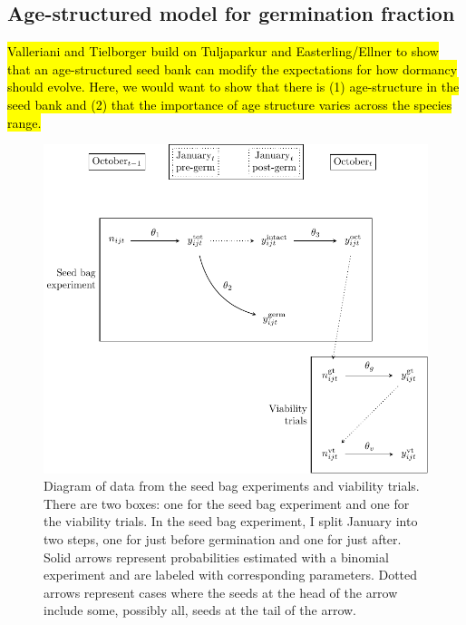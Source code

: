 \documentclass[12pt, oneside, titlepage]{article}   	%
\begin{document}
\subsection{Age-structured model for germination fraction}

\hl{Valleriani and Tielborger build on Tuljaparkur and Easterling/Ellner to show that an age-structured seed bank can modify the expectations for how dormancy should evolve. Here, we would want to show that there is (1) age-structure in the seed bank and (2) that the importance of age structure varies across the species range.}
\fi

\clearpage

\begin{figure}[!htbp]
\centering
       \includegraphics[page=1,width=.9\textwidth]{../../miscellaneous/seed-bag-figure.pdf}  
  \caption{Diagram of data from the seed bag experiments and viability trials. There are two boxes: one for the seed bag experiment and one for the viability trials. In the seed bag experiment, I split January into two steps, one for just before germination and one for just after. Solid arrows represent probabilities estimated with a binomial experiment and are labeled with corresponding parameters. Dotted arrows represent cases where the seeds at the head of the arrow include some, possibly all, seeds at the tail of the arrow.}\label{seedexperiments}
 \label{fig:seedBagDiagram}
\end{figure}

\clearpage
 

\end{document}
